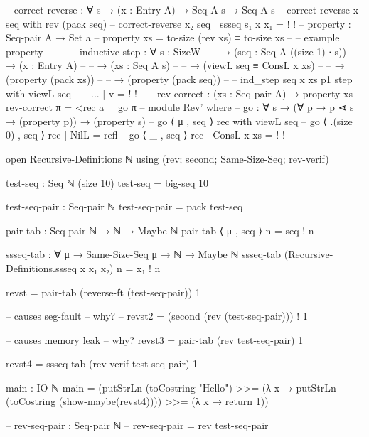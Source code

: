      -- correct-reverse : ∀ {s} → (x : Entry A) → Seq A s → Seq A s
      -- correct-reverse x seq with rev (pack seq)
      -- correct-reverse x₂ seq | ssseq s₁ x x₁ = {!  !}
      -- property : Seq-pair A → Set a
      -- property xs = to-size (rev xs) ≡ to-size xs
      -- -- example property
      --
      --
      -- -- inductive-step : ∀ {s : SizeW}
      -- --           → (seq : Seq A ((size 1) ∙ s))
      -- --           → (x : Entry A)
      -- --           → (xs : Seq A s)
      -- --           → (viewL seq ≡ ConsL x xs)
      -- --           → (property (pack xs))
      -- --           → (property (pack seq))
      -- -- ind_step seq x xs p1 step with viewL seq
      -- -- ... | v = {!   !}
      --
      -- rev-correct : (xs : Seq-pair A) → property xs
      -- rev-correct π = <rec a _ go π
      --   module Rev' where
      --   go : ∀ s → (∀ p → p ⋖ s → (property p)) → (property s)
      --   go ⟨ μ , seq ⟩ rec with viewL seq
      --   go ⟨ .(size 0) , seq ⟩ rec | NilL = refl
      --   go ⟨ _ , seq ⟩ rec | ConsL x xs = {!   !}

    open Recursive-Definitions ℕ using (rev; second; Same-Size-Seq; rev-verif)

    test-seq : Seq ℕ (size 10)
    test-seq = big-seq 10

    test-seq-pair : Seq-pair ℕ
    test-seq-pair = pack test-seq

    pair-tab : Seq-pair ℕ → ℕ → Maybe ℕ
    pair-tab ⟨ μ , seq ⟩ n = seq ! n

    ssseq-tab : ∀ {μ} → Same-Size-Seq μ → ℕ → Maybe ℕ
    ssseq-tab (Recursive-Definitions.ssseq x x₁ x₂) n = x₁ ! n

    revst = pair-tab (reverse-ft (test-seq-pair)) 1

    -- causes seg-fault -- why?
    -- revst2 = (second (rev (test-seq-pair))) ! 1

    -- causes memory leak -- why?
    revst3 = pair-tab (rev test-seq-pair) 1

    revst4 = ssseq-tab (rev-verif test-seq-pair) 1

    main : IO ℕ
    main = (putStrLn (toCostring "Hello") >>=
            (λ x → putStrLn (toCostring (show-maybe(revst4)))) >>=
            (λ x → return 1))

    -- rev-seq-pair : Seq-pair ℕ
    -- rev-seq-pair = rev test-seq-pair
